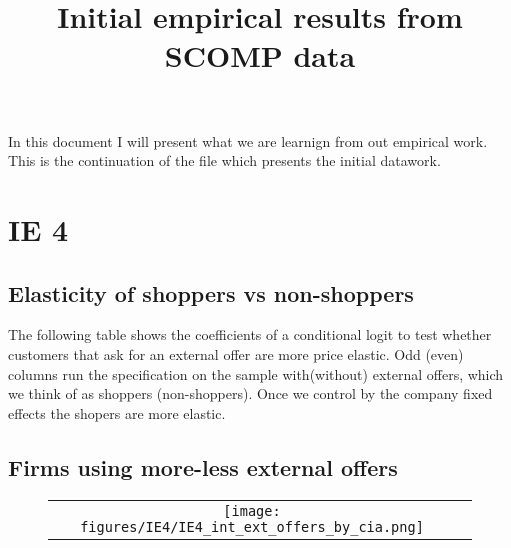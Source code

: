 \documentclass[12pt]{article}
\begin{document}
\title{Initial empirical results from SCOMP data}

\maketitle

In this document I will present what we are learnign from out empirical work. This is the continuation of the file which presents the initial datawork. 

\section{IE 4}

\subsection{Elasticity of shoppers vs non-shoppers}

The following table shows the coefficients of a conditional logit to test whether customers that ask for an external offer are more price elastic. Odd (even) columns run the specification on the sample with(without) external offers, which we think of as shoppers (non-shoppers). Once we control by the company fixed effects the shopers are more elastic. 


 \newpage 
 
 
 

 
\subsection{Firms using more-less external offers}

\begin{figure}[H]
\caption{}
 \label{fig:ie4_1}
\centering{}%
\begin{tabular}{cc}
\texttt{[image: figures/IE4/IE4\_int\_ext\_offers\_by\_cia.png]} 
\end{tabular}
\end{figure}

   
\end{document}
